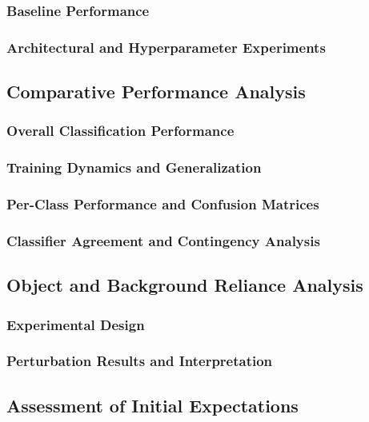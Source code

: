 \documentclass[conference]{IEEEtran}
\begin{document}
\subsubsection{Baseline Performance}

\subsubsection{Architectural and Hyperparameter Experiments}


\subsection{Comparative Performance Analysis}

\subsubsection{Overall Classification Performance}

\subsubsection{Training Dynamics and Generalization}

\subsubsection{Per-Class Performance and Confusion Matrices}

\subsubsection{Classifier Agreement and Contingency Analysis}


\subsection{Object and Background Reliance Analysis}

\subsubsection{Experimental Design}

\subsubsection{Perturbation Results and Interpretation}


\subsection{Assessment of Initial Expectations}
\end{document}
